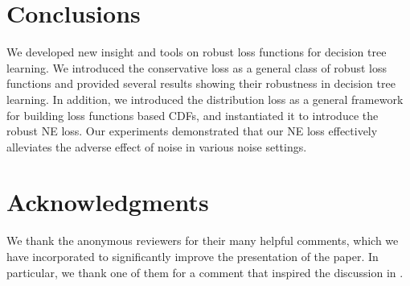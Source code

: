 \documentclass[letterpaper]{article} %
\begin{document}

\section{Conclusions}

We developed new insight and tools on robust loss functions for decision tree learning.
We introduced the conservative loss as a general class of robust loss functions
and provided several results showing their robustness in decision tree learning.
In addition, we introduced the distribution loss as a general framework for
building loss functions based CDFs, and instantiated it to introduce the
robust NE loss.
Our experiments demonstrated that our NE loss effectively alleviates the adverse effect of
noise in various noise settings.




\section*{Acknowledgments}
We thank the anonymous reviewers for their many helpful comments, which we have incorporated to
significantly improve the presentation of the paper.
In particular, we thank one of them for a comment that inspired the discussion in
.
\end{document}
